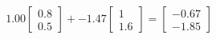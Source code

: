 \documentclass[preview]{standalone}
\begin{document}
\begin{align*}
1.00 \begin{bmatrix} 0.8 \\ 0.5 \end{bmatrix} + -1.47 \begin{bmatrix} 1 \\ 1.6 \end{bmatrix} = \begin{bmatrix} -0.67 \\ -1.85 \end{bmatrix}
\end{align*}
\end{document}
